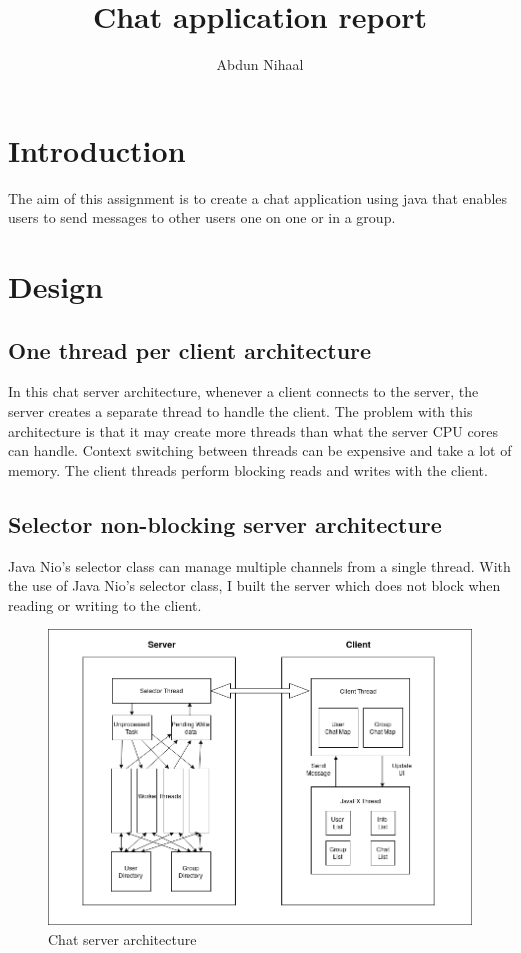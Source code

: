\documentclass{article}
\title{Chat application report}
\author{Abdun Nihaal}
\begin{document}
\maketitle

\section{Introduction}
The aim of this assignment is to create a chat application using java that enables users to send messages to other users one on one or in a group.

\section{Design}

\subsection{One thread per client architecture}
In this chat server architecture, whenever a client connects to the server, the server creates a separate thread to handle the client.
The problem with this architecture is that it may create more threads than what the server CPU cores can handle.
Context switching between threads can be expensive and take a lot of memory.
The client threads perform blocking reads and writes with the client.

\subsection{Selector non-blocking server architecture}
Java Nio's selector class can manage multiple channels from a single thread. 
With the use of Java Nio's selector class, I built the server which does not block when reading or writing to the client.

\begin{figure}
	\includegraphics[width=\linewidth]{architecture.png}
	\caption{Chat server architecture}
	\label{fig:architecture}
\end{figure}
\end{document}
